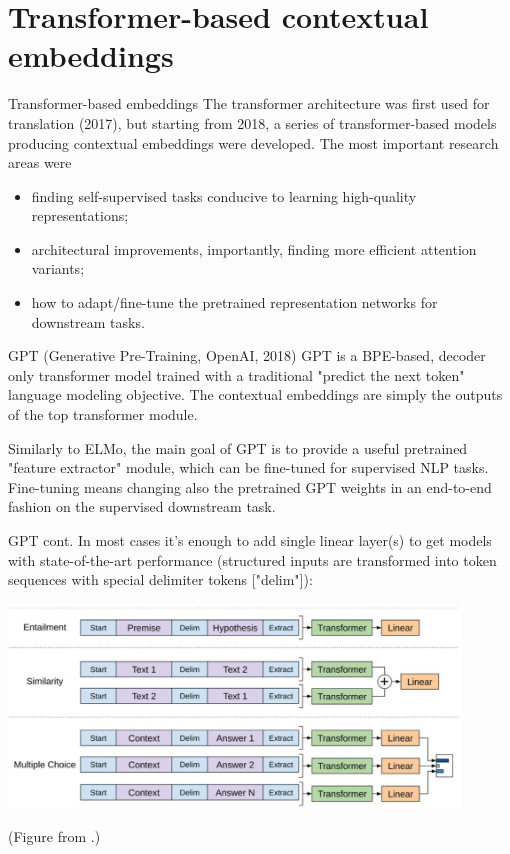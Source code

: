 \documentclass[style=upen, size=14pt]{powerdot}
\theoremstyle{definition}
\begin{document}
\section{Transformer-based contextual embeddings}

\begin{slide}[toc=Introduction]{Transformer-based embeddings}
  The transformer architecture was first used for translation (2017), but
  starting from 2018, a series of transformer-based models producing contextual
  embeddings were developed. The most important research areas were
  \begin{itemize}
  \item finding self-supervised tasks conducive to learning high-quality
    representations;
  \item architectural improvements, importantly, finding more efficient attention variants;
  \item how to adapt/fine-tune the pretrained representation networks for
    downstream tasks.
  \end{itemize}
\end{slide}

\begin{slide}[toc=GPT]{GPT (Generative Pre-Training, OpenAI, 2018)}
  GPT is a BPE-based, decoder only transformer model trained with a
  traditional "predict the next token" language modeling objective. The
  contextual embeddings are simply the outputs of the top transformer module.\bigskip

  Similarly to ELMo, the main goal of GPT is to provide a useful pretrained
  "feature extractor" module, which can be fine-tuned for supervised NLP tasks.
  Fine-tuning means changing also the pretrained GPT weights in an end-to-end
  fashion on the supervised downstream task.
\end{slide}

\begin{slide}[toc=]{GPT cont.}
  In most cases it's enough to add single linear layer(s) to get models with
  state-of-the-art performance (structured inputs are transformed into token
  sequences with special delimiter tokens ["delim"]):
  
  \begin{centering}
    
    \includegraphics[width=0.9\textwidth]{figures/gpt.eps}

    \footnotesize{(Figure from \cite{radford2018improving}.)}
    
  \end{centering}  
\end{slide}
\end{document}

